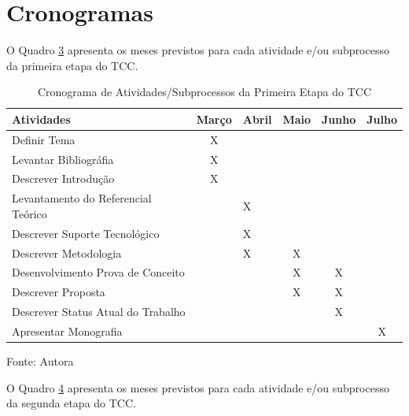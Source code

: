 \section{Cronogramas}\label{sec:cronog}

O Quadro \hyperref[tab:3]{3} apresenta os meses previstos para cada atividade e/ou subprocesso da primeira etapa do TCC.

\begin{table}[htbp]
    \centering
    \begin{threeparttable}
        \caption{Cronograma de Atividades/Subprocessos da Primeira Etapa do TCC}
        \label{tab:3}
        \begin{tabular}{|>{\raggedright\arraybackslash}m{6cm} c m{1cm} c c c|}
        \hline 
        Atividades & Março & Abril & Maio & Junho & Julho \\
        \hline 
        Definir Tema & X &  &  &  & \\
        \hline 
        Levantar Bibliográfia & X &  &  &  & \\
        \hline 
        Descrever Introdução & X &  &  &  & \\
        \hline 
        Levantamento do Referencial Teórico &  & X & &  & \\
        \hline 
        Descrever Suporte Tecnológico & & X & &  & \\
        \hline 
        Descrever Metodologia &  & X &  X &  & \\
        \hline 
        Desenvolvimento Prova de Conceito &  &  & X & X & \\
        \hline 
        Descrever Proposta &  &  & X & X & \\
        \hline 
        Descrever Status Atual do Trabalho &  &  &  & X & \\
        \hline
        Apresentar Monografia &  &  &  & & X \\
        \hline  
        \end{tabular}
        \begin{tablenotes}
            \small
            \centering
            \item Fonte: Autora
        \end{tablenotes}
    \end{threeparttable}
\end{table}

O Quadro \hyperref[tab:4]{4} apresenta os meses previstos para cada atividade e/ou subprocesso da segunda etapa do TCC.


